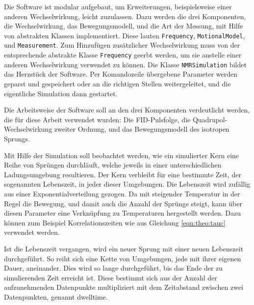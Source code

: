Die Software ist modular aufgebaut, um Erweiterungen, beispielsweise einer anderen Wechselwirkung, leicht zuzulassen. Dazu werden die drei Komponenten, die Wechselwirkung, das Bewegungsmodell, und die Art der Messung, mit Hilfe von abstrakten Klassen implementiert. Diese lauten \texttt{Frequency}, \texttt{MotionalModel}, und \texttt{Measurement}. Zum Hinzufügen zusätzlicher Wechselwirkung muss von der entsprechende abstrakte Klasse \texttt{Frequency} geerbt werden, um sie anstelle einer anderen Wechselwirkung verwendet zu können. Die Klasse \texttt{NMRSimulation} bildet das Herzstück der Software. Per Komandozeile übergebene Parameter werden geparst und gespeichert oder an die richtigen Stellen weitergeleitet, und die eigentliche Simulation dann gestartet.

Die Arbeitsweise der Software soll an den drei Komponenten verdeutlicht werden, die für diese Arbeit verwendet wurden: Die FID-Pulsfolge, die Quadrupol-Wechselwirkung zweiter Ordnung, und das Bewegungsmodell des isotropen Sprungs.

Mit Hilfe der Simulation soll beobachtet werden, wie ein simulierter Kern eine Reihe von Sprüngen durchläuft, welche jeweils in einer unterschiedlichen Ladungsumgebung resultieren. Der Kern verbleibt für eine bestimmte Zeit, der sogenannten Lebenszeit, in jeder dieser Umgebungen. Die Lebenszeit wird zufällig aus einer Exponentialverteilung gezogen. Da mit steigender Temperatur in der Regel die Bewegung, und damit auch die Anzahl der Sprünge steigt, kann über diesen Parameter eine Verknüpfung zu Temperaturen hergestellt werden. Dazu können zum Beispiel Korrelationszeiten wie aus Gleichung \eqref{eqn:theo:tauc} verwendet werden.

Ist die Lebenszeit vergangen, wird ein neuer Sprung mit einer neuen Lebenszeit durchgeführt. So reiht sich eine Kette von Umgebungen, jede mit ihrer eigenen Dauer, aneinander. Dies wird so lange durchgeführt, bis das Ende der zu simulierenden Zeit erreicht ist. Diese bestimmt sich aus der Anzahl der aufzunehmenden Datenpunkte multipliziert mit dem Zeitabstand zwischen zwei Datenpunkten, genannt dwelltime.

